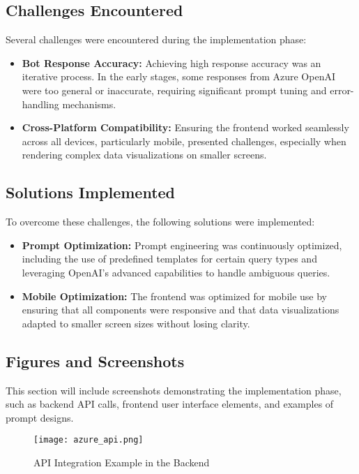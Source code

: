 \documentclass[a4paper,12pt]{report}
\begin{document}
\subsection*{Challenges Encountered}
Several challenges were encountered during the implementation phase:
\begin{itemize}
    \item \textbf{Bot Response Accuracy:} Achieving high response accuracy was an iterative process. In the early stages, some responses from Azure OpenAI were too general or inaccurate, requiring significant prompt tuning and error-handling mechanisms.
    \item \textbf{Cross-Platform Compatibility:} Ensuring the frontend worked seamlessly across all devices, particularly mobile, presented challenges, especially when rendering complex data visualizations on smaller screens.
\end{itemize}

\subsection*{Solutions Implemented}
To overcome these challenges, the following solutions were implemented:
\begin{itemize}
    \item \textbf{Prompt Optimization:} Prompt engineering was continuously optimized, including the use of predefined templates for certain query types and leveraging OpenAI’s advanced capabilities to handle ambiguous queries.
    \item \textbf{Mobile Optimization:} The frontend was optimized for mobile use by ensuring that all components were responsive and that data visualizations adapted to smaller screen sizes without losing clarity.
\end{itemize}

\subsection*{Figures and Screenshots}
This section will include screenshots demonstrating the implementation phase, such as backend API calls, frontend user interface elements, and examples of prompt designs.

\begin{figure}[H]
    \centering
    \texttt{[image: azure\_api.png]}
    \caption{API Integration Example in the Backend}
    \label{fig:api-integration}
\end{figure}
\end{document}
